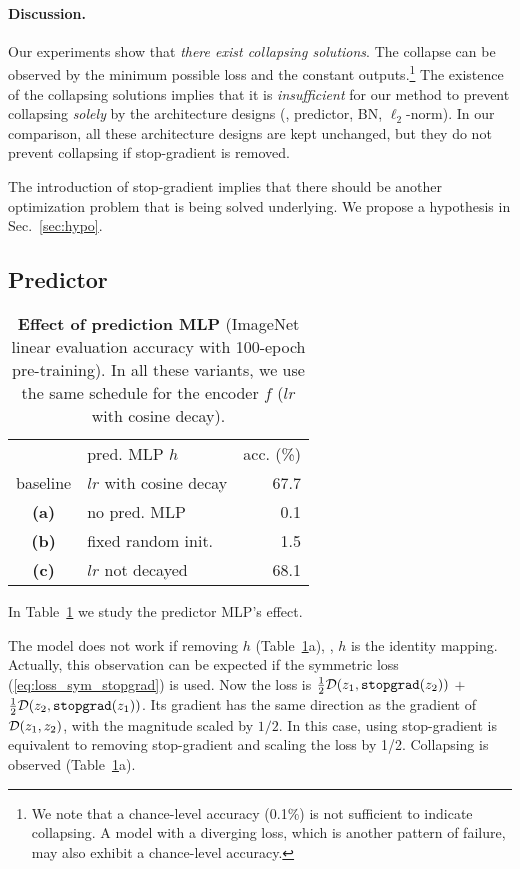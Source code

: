 \documentclass[final]{cvpr}
\newcommand{\dist}{\mathcal{D}}
\newcommand{\tablestyle}[2]{\setlength{\tabcolsep}{#1}\renewcommand{\arraystretch}{#2}\centering\footnotesize}
\begin{document}
\paragraph{Discussion.}
Our experiments show that \emph{there exist collapsing solutions}. 
The collapse can be observed by the minimum possible loss and the constant outputs.\footnote{We note that a chance-level accuracy (0.1\%) is not sufficient to indicate collapsing. A model with a diverging loss, which is another pattern of failure, may also exhibit a chance-level accuracy. }
The existence of the collapsing solutions implies that it is \emph{insufficient} for our method to prevent collapsing \emph{solely} by the architecture designs (\eg, predictor, BN, $\ell_2$-norm). In our comparison, all these architecture designs are kept unchanged, but they do not prevent collapsing if stop-gradient is removed.

The introduction of stop-gradient implies that there should be another optimization problem that is being solved underlying. We propose a hypothesis in Sec.~\ref{sec:hypo}.

\subsection{Predictor} \label{subsec:mlp2}

\begin{table}[t]
\centering
\small
\tablestyle{8pt}{1.1}
\begin{tabular}{cl|r}
& {pred. MLP $h$}  & acc. (\%) \\
\shline
baseline & $lr$ with cosine decay & 67.7 \\
\textbf{(a)} & no pred. MLP & 0.1 \\
\textbf{(b)} & fixed random init. & 1.5 \\
\textbf{(c)} & $lr$ not decayed & 68.1  \\
\end{tabular}
\vspace{.5em}
\caption{\textbf{Effect of prediction MLP}  (ImageNet linear evaluation accuracy with 100-epoch pre-training). In all these variants, we use the same schedule for the encoder $f$ (\mbox{$lr$} with cosine decay). 
\label{tab:mlp2}
}
\end{table}


In Table~\ref{tab:mlp2} we study the predictor MLP's effect. 

The model does not work if removing $h$ (Table~\ref{tab:mlp2}a), \ie, $h$ is the identity mapping.
Actually, this observation can be expected if the symmetric loss (\ref{eq:loss_sym_stopgrad}) is used. Now the loss is $\frac{1}{2}\dist(\z_1, \texttt{stopgrad}(\z_2))$ ${+}$ $\frac{1}{2}\dist(\z_2, \texttt{stopgrad}(\z_1))$. Its gradient has the same direction as the gradient of $\dist(\z_1, \z_2)$, with the magnitude scaled by $1/2$. In this case, using stop-gradient is equivalent to removing stop-gradient and scaling the loss by 1/2. Collapsing is observed (Table~\ref{tab:mlp2}a).
\end{document}
